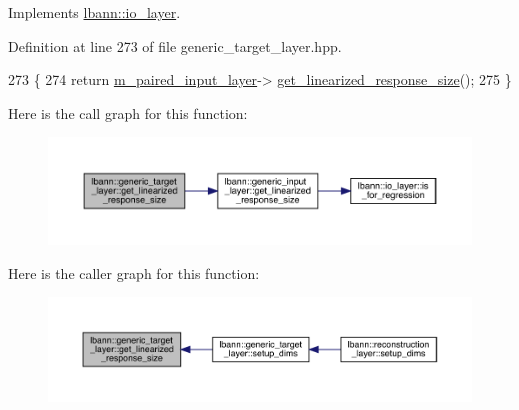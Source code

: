 Implements \hyperlink{classlbann_1_1io__layer_acbc2723e37e911eef6a38caa02c9e708}{lbann\+::io\+\_\+layer}.



Definition at line 273 of file generic\+\_\+target\+\_\+layer.\+hpp.


\begin{DoxyCode}
273                                                      \{
274     \textcolor{keywordflow}{return} \hyperlink{classlbann_1_1generic__target__layer_a84da1260e9feb4fbc3e6f2315e4cab4b}{m\_paired\_input\_layer}->
      \hyperlink{classlbann_1_1generic__input__layer_a6e5e587aa5b32bdfd2dd579a2746885d}{get\_linearized\_response\_size}();
275   \}
\end{DoxyCode}
Here is the call graph for this function\+:\nopagebreak
\begin{figure}[H]
\begin{center}
\leavevmode
\includegraphics[width=350pt]{classlbann_1_1generic__target__layer_a55c3e1bcb3e4611c379b1082183b3e66_cgraph}
\end{center}
\end{figure}
Here is the caller graph for this function\+:\nopagebreak
\begin{figure}[H]
\begin{center}
\leavevmode
\includegraphics[width=350pt]{classlbann_1_1generic__target__layer_a55c3e1bcb3e4611c379b1082183b3e66_icgraph}
\end{center}
\end{figure}
\mbox{\label{classlbann_1_1generic__target__layer_a0187134110cd8a641e15f86e010b75a7}} 
